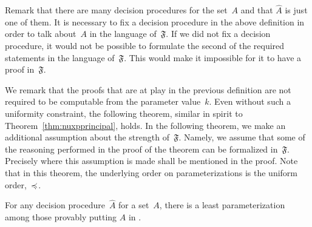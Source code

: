 Remark that there are many decision procedures for the set~$A$ and that $\hat{A}$ is just one of them.
It is necessary to fix a decision procedure in the above definition in order to talk about~$A$ in the language of~$\mathfrak{F}$.
If we did not fix a decision procedure, it would not be possible to formulate the second of the required statements in the language of~$\mathfrak{F}$.
This would make it impossible for it to have a proof in~$\mathfrak{F}$.

We remark that the proofs that are at play in the previous definition are not required to be computable from the parameter value~$k$.
Even without such a uniformity constraint, the following theorem, similar in spirit to Theorem~\ref{thm:nuxpprincipal}, holds.
In the following theorem, we make an additional assumption about the strength of~$\mathfrak{F}$.
Namely, we assume that some of the reasoning performed in the proof of the theorem can be formalized in~$\mathfrak{F}$.
Precisely where this assumption is made shall be mentioned in the proof.
Note that in this theorem, the underlying order on parameterizations is the uniform order,~$\preccurlyeq$.
\begin{theorem}
\label{thm:xpprincipal}%
  For any decision procedure~$\hat{A}$ for a set~$A$, there is a least parameterization among those provably putting $\hat{A}$ in .
\end{theorem}

